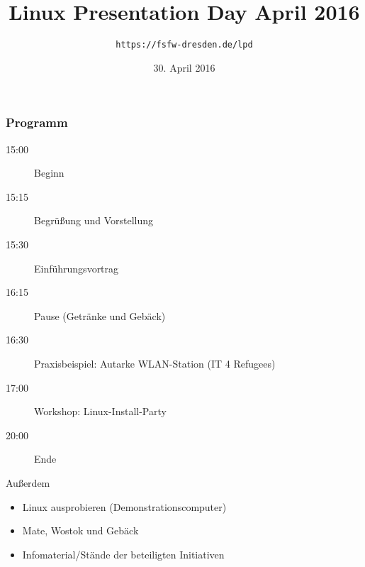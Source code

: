 \documentclass[t]{beamer}
\title{Linux Presentation Day April 2016}
\author{\texttt{https://fsfw-dresden.de/lpd}}
\date[30.04.2016]{30. April 2016}
\begin{document}
\begin{frame}
  \frametitle{Programm}
  \vspace*{-1em}
  \begin{description}
  \item[15:00] Beginn
  \item[15:15] Begrüßung und Vorstellung
  \item[15:30] Einführungsvortrag
  \item[16:15] Pause (Getränke und Gebäck)
  \item[16:30] Praxisbeispiel: Autarke WLAN-Station (IT 4 Refugees)
  \item[17:00] Workshop: Linux-Install-Party
  \item[20:00] Ende
  \end{description}
  \begin{block}{Außerdem}
    \begin{itemize}
    \item Linux ausprobieren (Demonstrationscomputer)
    \item Mate, Wostok und Gebäck
    \item Infomaterial/Stände der beteiligten Initiativen
    \end{itemize}
  \end{block}
\end{frame}
\end{document}
